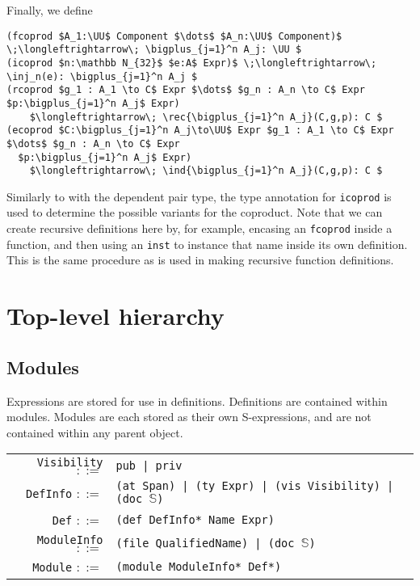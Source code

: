 \documentclass[11pt]{book}
\DeclareMathOperator*{\bigplus}{\scalerel*{+}{\textstyle\sum}}
\begin{document}
Finally, we define
\begin{lstlisting}[mathescape=true]
(fcoprod $A_1:\UU$ Component $\dots$ $A_n:\UU$ Component)$ \;\longleftrightarrow\; \bigplus_{j=1}^n A_j: \UU $
(icoprod $n:\mathbb N_{32}$ $e:A$ Expr)$ \;\longleftrightarrow\; \inj_n(e): \bigplus_{j=1}^n A_j $
(rcoprod $g_1 : A_1 \to C$ Expr $\dots$ $g_n : A_n \to C$ Expr $p:\bigplus_{j=1}^n A_j$ Expr)
    $\longleftrightarrow\; \rec{\bigplus_{j=1}^n A_j}(C,g,p): C $
(ecoprod $C:\bigplus_{j=1}^n A_j\to\UU$ Expr $g_1 : A_1 \to C$ Expr $\dots$ $g_n : A_n \to C$ Expr
  $p:\bigplus_{j=1}^n A_j$ Expr)
    $\longleftrightarrow\; \ind{\bigplus_{j=1}^n A_j}(C,g,p): C $
\end{lstlisting}
Similarly to with the dependent pair type, the type annotation for \lstinline{icoprod} is used to determine the possible variants for the coproduct.
Note that we can create recursive definitions here by, for example, encasing an \lstinline{fcoprod} inside a function, and then using an \lstinline{inst} to instance that name inside its own definition.
This is the same procedure as is used in making recursive function definitions.


\section{Top-level hierarchy}

\subsection{Modules}

Expressions are stored for use in definitions.
Definitions are contained within modules.
Modules are each stored as their own S-expressions, and are not contained within any parent object.

\begin{tabular}{r l p{7cm}}
    \lstinline!Visibility! \( ::= \) & \lstinline!pub | priv! \\
    \lstinline!DefInfo! \( ::= \) & \lstinline!(at Span) | (ty Expr) | (vis Visibility) | (doc !\( \mathbb S \)\lstinline!)! \\
    \lstinline!Def! \( ::= \) & \lstinline!(def DefInfo* Name Expr)! \\
    \lstinline!ModuleInfo! \( ::= \) & \lstinline!(file QualifiedName) | (doc !\( \mathbb S \)\lstinline!)! \\
    \lstinline!Module! \( ::= \) & \lstinline!(module ModuleInfo* Def*)!
\end{tabular}
\end{document}
